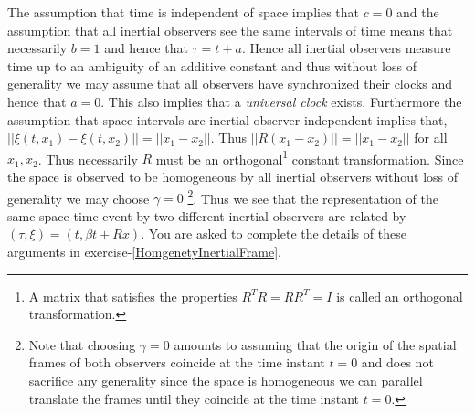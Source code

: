\documentclass[graybox,envcountchap,sectrefs]{svmonoMuga}
\begin{document}
The assumption that time is independent of space implies that $c=0$ and the assumption that all inertial observers see the same intervals of time means that necessarily  $b=1$ and hence that $\tau=t+a$. Hence all inertial observers measure time up to an ambiguity of an additive constant and thus  without loss of generality we may assume that all observers have synchronized their clocks and hence that $a=0$. This also implies that a \emph{universal clock} exists.  
Furthermore the assumption that space intervals are inertial observer independent implies that, $||\xi(t,x_1)-\xi(t,x_2)||=||x_1-x_2||$. Thus $||R (x_1-x_2)||=||x_1-x_2||$ for all $x_1, x_2$. Thus necessarily $R$ must be an orthogonal\footnote{A matrix that satisfies the properties $R^TR=RR^T=I$ is called an orthogonal transformation.} constant transformation. 
Since the space is observed to be homogeneous by all inertial observers without loss of generality we may choose $\gamma=0$ \footnote{Note that choosing $\gamma=0$ amounts to assuming that the origin of the spatial frames of both observers coincide at the time instant $t=0$ and does not sacrifice any generality since the space is homogeneous we can parallel translate the frames until they coincide at the time instant $t=0$.}.  Thus we see that the representation of the same space-time event by two different inertial observers are related by $(\tau,\xi)=(t,\beta t+Rx)$. You are asked to complete the details of these arguments in exercise-\ref{HomgenetyInertialFrame}.
\end{document}
